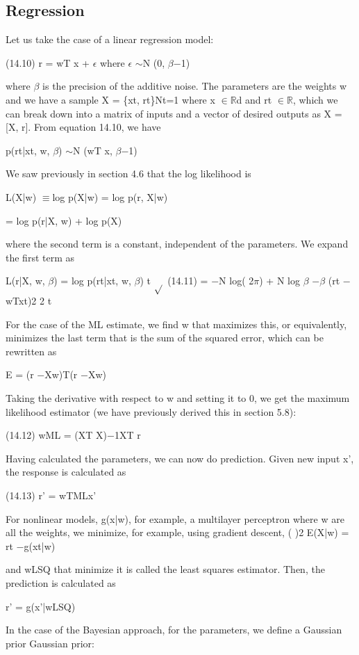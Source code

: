\subsection{Regression}

Let us take the case of a linear regression model:

(14.10) r = wT x + $\epsilon$ where $\epsilon$ $\sim$N (0, $\beta$$-$1)

where $\beta$ is the precision of the additive noise. The parameters are the weights w and we have a sample X = \{xt, rt\}Nt=1 where x $\in$$\mathbb{R}$d and rt $\in$$\mathbb{R}$, which we can break down into a matrix of inputs and a vector of desired outputs as X = [X, r]. From equation 14.10, we have

p(rt|xt, w, $\beta$) $\sim$N (wT x, $\beta$$-$1)

We saw previously in section 4.6 that the log likelihood is

L(X|w) $\equiv$log p(X|w) = log p(r, X|w)

= log p(r|X, w) + log p(X)

where the second term is a constant, independent of the parameters. We expand the first term as

L(r|X, w, $\beta$) = log p(rt|xt, w, $\beta$) t $\sqrt{}$ (14.11) = $-$N log( 2$\pi$) + N log $\beta$ $-$$\beta$ (rt $-$wTxt)2 2 t

For the case of the ML estimate, we find w that maximizes this, or equivalently, minimizes the last term that is the sum of the squared error, which can be rewritten as

E = (r $-$Xw)T(r $-$Xw)

Taking the derivative with respect to w and setting it to 0, we get the maximum likelihood estimator (we have previously derived this in section 5.8):

(14.12) wML = (XT X)$-$1XT r

Having calculated the parameters, we can now do prediction. Given new input x', the response is calculated as

(14.13) r' = wTMLx'

For nonlinear models, g(x|w), for example, a multilayer perceptron where w are all the weights, we minimize, for example, using gradient descent, ( )2 E(X|w) = rt $-$g(xt|w)

and wLSQ that minimize it is called the least squares estimator. Then, the prediction is calculated as

r' = g(x'|wLSQ)

In the case of the Bayesian approach, for the parameters, we define a Gaussian prior Gaussian prior:

